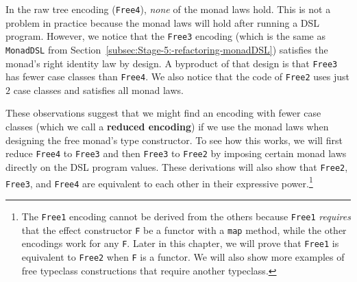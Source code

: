In the raw tree encoding (\lstinline!Free4!),
\emph{none} of the monad laws hold. This is not a problem in practice
because the monad laws will hold after running a DSL program. However,
we notice that the \lstinline!Free3!
encoding (which is the same as \lstinline!MonadDSL!
from Section~\ref{subsec:Stage-5:-refactoring-monadDSL}) satisfies
the monad\textsf{'}s right identity law by design. A byproduct of that design
is that \lstinline!Free3!
has fewer case classes than \lstinline!Free4!.
We also notice that the code of \lstinline!Free2!
uses just $2$ case classes and satisfies all monad laws.

These observations suggest that we might find an encoding with fewer
case classes (which we call a \textbf{reduced encoding}) if we use
the monad laws when designing the free monad\textsf{'}s type constructor. To
see how this works, we will first reduce \lstinline!Free4!
to \lstinline!Free3! and
then \lstinline!Free3!
to \lstinline!Free2! by
imposing certain monad laws directly on the DSL program values. These
derivations will also show that \lstinline!Free2!,
\lstinline!Free3!, and
\lstinline!Free4! are equivalent
to each other in their expressive power.\footnote{The \lstinline!Free1! encoding
cannot be derived from the others because \lstinline!Free1!
\emph{requires} that the effect constructor \lstinline!F!
be a functor with a \lstinline!map!
method, while the other encodings work for any \lstinline!F!.
Later in this chapter, we will prove that \lstinline!Free1!
is equivalent to \lstinline!Free2!
when \lstinline!F! is a
functor. We will also show more examples of free typeclass constructions
that require another typeclass.}

